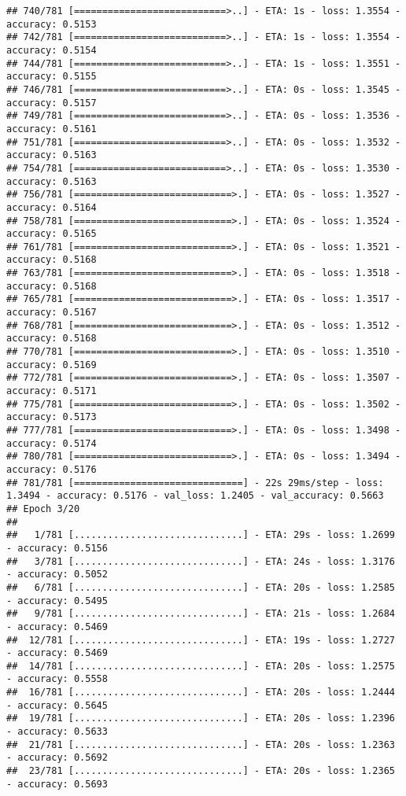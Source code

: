 \documentclass[
]{article}
\begin{document}
\begin{verbatim}
## 740/781 [===========================>..] - ETA: 1s - loss: 1.3554 - accuracy: 0.5153
## 742/781 [===========================>..] - ETA: 1s - loss: 1.3554 - accuracy: 0.5154
## 744/781 [===========================>..] - ETA: 1s - loss: 1.3551 - accuracy: 0.5155
## 746/781 [===========================>..] - ETA: 0s - loss: 1.3545 - accuracy: 0.5157
## 749/781 [===========================>..] - ETA: 0s - loss: 1.3536 - accuracy: 0.5161
## 751/781 [===========================>..] - ETA: 0s - loss: 1.3532 - accuracy: 0.5163
## 754/781 [===========================>..] - ETA: 0s - loss: 1.3530 - accuracy: 0.5163
## 756/781 [============================>.] - ETA: 0s - loss: 1.3527 - accuracy: 0.5164
## 758/781 [============================>.] - ETA: 0s - loss: 1.3524 - accuracy: 0.5165
## 761/781 [============================>.] - ETA: 0s - loss: 1.3521 - accuracy: 0.5168
## 763/781 [============================>.] - ETA: 0s - loss: 1.3518 - accuracy: 0.5168
## 765/781 [============================>.] - ETA: 0s - loss: 1.3517 - accuracy: 0.5167
## 768/781 [============================>.] - ETA: 0s - loss: 1.3512 - accuracy: 0.5168
## 770/781 [============================>.] - ETA: 0s - loss: 1.3510 - accuracy: 0.5169
## 772/781 [============================>.] - ETA: 0s - loss: 1.3507 - accuracy: 0.5171
## 775/781 [============================>.] - ETA: 0s - loss: 1.3502 - accuracy: 0.5173
## 777/781 [============================>.] - ETA: 0s - loss: 1.3498 - accuracy: 0.5174
## 780/781 [============================>.] - ETA: 0s - loss: 1.3494 - accuracy: 0.5176
## 781/781 [==============================] - 22s 29ms/step - loss: 1.3494 - accuracy: 0.5176 - val_loss: 1.2405 - val_accuracy: 0.5663
## Epoch 3/20
## 
##   1/781 [..............................] - ETA: 29s - loss: 1.2699 - accuracy: 0.5156
##   3/781 [..............................] - ETA: 24s - loss: 1.3176 - accuracy: 0.5052
##   6/781 [..............................] - ETA: 20s - loss: 1.2585 - accuracy: 0.5495
##   9/781 [..............................] - ETA: 21s - loss: 1.2684 - accuracy: 0.5469
##  12/781 [..............................] - ETA: 19s - loss: 1.2727 - accuracy: 0.5469
##  14/781 [..............................] - ETA: 20s - loss: 1.2575 - accuracy: 0.5558
##  16/781 [..............................] - ETA: 20s - loss: 1.2444 - accuracy: 0.5645
##  19/781 [..............................] - ETA: 20s - loss: 1.2396 - accuracy: 0.5633
##  21/781 [..............................] - ETA: 20s - loss: 1.2363 - accuracy: 0.5692
##  23/781 [..............................] - ETA: 20s - loss: 1.2365 - accuracy: 0.5693

\end{verbatim}
\end{document}
